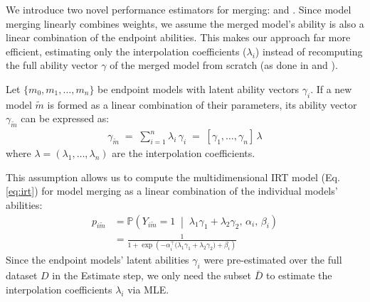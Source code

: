 We introduce two novel performance estimators for merging: \mpirt{} and \gmpirt{}. Since model merging linearly combines weights, we assume the merged model's ability is also a linear combination of the endpoint abilities. This makes our approach far more efficient, estimating only the interpolation coefficients ($\lambda_i$) instead of recomputing the full ability vector $\gamma$ of the merged model from scratch (as done in \pirt{} and \gpirt{} \cite{tinybenchmarks}).
%
\begin{assumption}\label{conj:latent-abilities-linear}
Let \(\{m_0, m_1, \dots, m_n\}\) be endpoint models with latent ability vectors \(\gamma_{i}\). If a new model \(\tilde{m}\) is formed as a linear combination of their parameters, its ability vector \(\gamma_{\tilde{m}}\) can be expressed as:
\begin{align}
    \gamma_{\tilde{m}}
    \;=\;
    \sum_{i=1}^n \lambda_i \,\gamma_{i}
    \;=\;
    [\gamma_{1}, \ldots, \gamma_{n}]\,\lambda
\end{align}
%
where \(\lambda = (\lambda_1, \ldots, \lambda_n)\) are the interpolation coefficients.
\end{assumption}
%
This assumption allows us to compute the multidimensional IRT model (Eq. \ref{eq:irt}) for model merging as a linear combination of the individual models' abilities:
\begin{align}
    p_{i\tilde{m}} 
    &= \mathbb{P}\!\left( Y_{i\tilde{m}} = 1 \;\middle|\; 
    \lambda_1 \gamma_{1} + \lambda_2 \gamma_{2}, \, 
    \alpha_i, \, \beta_i \right) \nonumber\\
    &= \frac{1}{1 + \exp\!\left( 
    -\alpha_i^\top \bigl( \lambda_1 \gamma_{1} 
    + \lambda_2 \gamma_{2} \bigr) 
    + \beta_i \right)}
     \label{eq:prob_model}
\end{align}
%
Since the endpoint models' latent abilities \(\gamma_i\) were pre-estimated over the full dataset \(D\) in the Estimate step, we only need the subset \(\bar{D}\) to estimate the interpolation coefficients \(\lambda_i\) via MLE.

